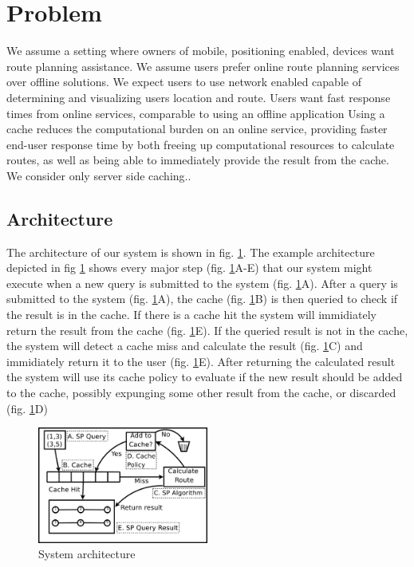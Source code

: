\section{Problem}\label{sec:problemdef}
We assume a setting where owners of mobile, positioning enabled, devices want route planning assistance. We assume users prefer online route planning services over offline solutions. 
We expect users to use network enabled capable of determining and visualizing users location and route.
Users want fast response times from online services, comparable to using an offline application \cite{ref}
Using a cache reduces the computational burden \cite{ref} on an online service, providing faster end-user response time \cite{ref} by both freeing up computational resources to calculate \spath routes, as well as being able to immediately provide the \spath result from the cache.
We consider only server side caching..



\subsection{Architecture}\label{sec:architec}

The architecture of our system is shown in fig. \ref{fig:advancedroutequery}. The example architecture depicted in fig \ref{fig:advancedroutequery} shows every major step (fig. \ref{fig:advancedroutequery}A-E) that our system might execute when a new \spath query is submitted to the system (fig. \ref{fig:advancedroutequery}A). After a \spath query is submitted to the system (fig. \ref{fig:advancedroutequery}A), the cache (fig. \ref{fig:advancedroutequery}B) is then queried to check if the result is in the cache. If there is a cache hit the system will immidiately return the result from the cache (fig. \ref{fig:advancedroutequery}E). If the queried \spath result is not in the cache, the system will detect a cache miss and calculate the result (fig. \ref{fig:advancedroutequery}C) and immidiately return it to the user (fig. \ref{fig:advancedroutequery}E). After returning the calculated result the system will use its cache policy to evaluate if the new result should be added to the cache, possibly expunging some other result from the cache, or discarded (fig. \ref{fig:advancedroutequery}D)


\begin{figure}
  \center
	\includegraphics[width=0.5\textwidth]{figures/advancedroutequery.pdf}
	\caption{System architecture}
  \label{fig:advancedroutequery}
\end{figure}


